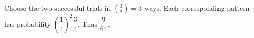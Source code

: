 Choose the two successful trials in $\binom32=3$ ways. Each corresponding pattern has probability $(\dfrac{1}{4})^2\dfrac{3}{4}$. Thus $\boxed{\dfrac{9}{64}}$.
